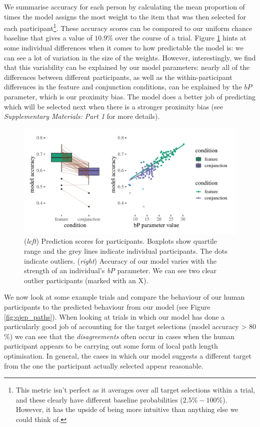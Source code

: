 \documentclass[preprints, article,submit,pdftex,moreauthors]{Definitions/mdpi}
\begin{document}
We summarise accuracy for each person by calculating the mean proportion of times the model assigns the most weight to the item that was then selected for each participant\footnote{This metric isn't perfect as it averages over all target selections within a trial, and these clearly have different baseline probabilities ($2.5\%-100\%$). However, it has the upside of being more intuitive than anything else we could think of.}. These accuracy scores can be compared to our uniform chance baseline that gives a value of $10.9\%$ over the course of a trial. Figure \ref{fig:cal2} hints at some individual differences when it comes to how predictable the model is: we can see a lot of variation in the size of the weights. However, interestingly, we find that this variability can be explained by our model parameters: nearly all of the differences between different participants, as well as the within-participant differences in the feature and conjunction conditions, can be explained by the $bP$ parameter, which is our proximity bias. The model does a better job of predicting which will be selected next when there is a stronger proximity bias (see \textit{Supplementary Materials: Part 1} for more details).

\begin{figure}[H]
\centering
\includegraphics[width=12 cm]{Figures/qjep_indiv_diff.pdf}
\caption{(\textit{left}) Prediction scores for participants. Boxplots show quartile range and the grey lines indicate individual participants. The dots indicate outliers. (\textit{right}) Accuracy of our model varies with the strength of an individual’s \textit{bP} parameter. We can see two clear outlier participants (marked with an X).}
\label{fig:cal2}
\end{figure}   

We now look at some example trials and compare the behaviour of our human participants to the predicted behaviour from our model (see Figure \ref{fig:qjep_paths}). When looking at trials in which our model has done a particularly good job of accounting for the target selections (model accuracy > 80$\%$) we can see that the \textit{disagreements} often occur in cases when the human participant appears to be carrying out some form of local path length optimisation. In general, the cases in which our model suggests a different target from the one the participant actually selected appear reasonable. 
\end{document}
